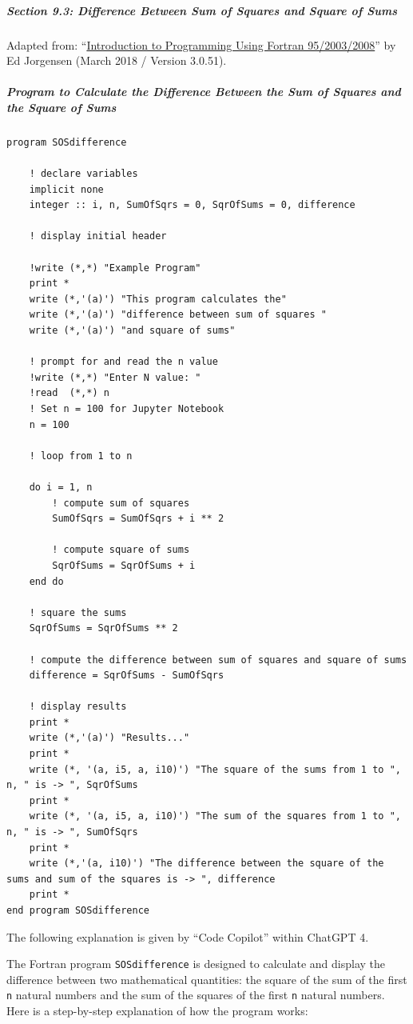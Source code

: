\subparagraph{Section 9.3: Difference Between Sum of Squares and Square of Sums}

Adapted from: ``\href{https://open.umn.edu/opentextbooks/textbooks/introduction-to-programming-using-fortran-95-2003-2008}{Introduction to Programming Using Fortran 95/2003/2008}'' by Ed Jorgensen (March 2018 / Version 3.0.51).

\subparagraph{Program to Calculate the Difference Between the Sum of Squares and the Square of Sums}

\begin{verbatim}
program SOSdifference

    ! declare variables
    implicit none
    integer :: i, n, SumOfSqrs = 0, SqrOfSums = 0, difference

    ! display initial header

    !write (*,*) "Example Program"
    print *
    write (*,'(a)') "This program calculates the"
    write (*,'(a)') "difference between sum of squares "
    write (*,'(a)') "and square of sums"

    ! prompt for and read the n value
    !write (*,*) "Enter N value: "
    !read  (*,*) n
    ! Set n = 100 for Jupyter Notebook
    n = 100

    ! loop from 1 to n

    do i = 1, n
        ! compute sum of squares
        SumOfSqrs = SumOfSqrs + i ** 2

        ! compute square of sums
        SqrOfSums = SqrOfSums + i
    end do

    ! square the sums
    SqrOfSums = SqrOfSums ** 2

    ! compute the difference between sum of squares and square of sums  
    difference = SqrOfSums - SumOfSqrs

    ! display results
    print *
    write (*,'(a)') "Results..."
    print *
    write (*, '(a, i5, a, i10)') "The square of the sums from 1 to ", n, " is -> ", SqrOfSums
    print *
    write (*, '(a, i5, a, i10)') "The sum of the squares from 1 to ", n, " is -> ", SumOfSqrs
    print *
    write (*,'(a, i10)') "The difference between the square of the sums and sum of the squares is -> ", difference
    print *
end program SOSdifference
\end{verbatim}

The following explanation is given by ``Code Copilot'' within ChatGPT 4.

The Fortran program \texttt{SOSdifference} is designed to calculate and display the difference between two mathematical quantities: the square of the sum of the first \texttt{n} natural numbers and the sum of the squares of the first \texttt{n} natural numbers. Here is a step-by-step explanation of how the program works:

